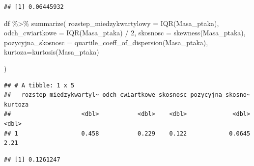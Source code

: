 \documentclass[]{article}
\newenvironment{Shaded}{\begin{snugshade}}{\end{snugshade}}
\newcommand{\AttributeTok}[1]{\textcolor[rgb]{0.77,0.63,0.00}{#1}}
\newcommand{\DecValTok}[1]{\textcolor[rgb]{0.00,0.00,0.81}{#1}}
\newcommand{\FunctionTok}[1]{\textcolor[rgb]{0.00,0.00,0.00}{#1}}
\newcommand{\NormalTok}[1]{#1}
\newcommand{\SpecialCharTok}[1]{\textcolor[rgb]{0.00,0.00,0.00}{#1}}
\begin{document}
\begin{Shaded}
\end{Shaded}

\begin{verbatim}
## [1] 0.06445932
\end{verbatim}

\begin{Shaded}
\begin{Highlighting}[]
\NormalTok{df }\SpecialCharTok{\%\textgreater{}\%}
  \FunctionTok{summarize}\NormalTok{(}
    \AttributeTok{rozstep\_miedzykwartylowy =} \FunctionTok{IQR}\NormalTok{(Masa\_ptaka), }
    \AttributeTok{odch\_cwiartkowe =} \FunctionTok{IQR}\NormalTok{(Masa\_ptaka) }\SpecialCharTok{/} \DecValTok{2}\NormalTok{,}
    \AttributeTok{skosnosc =} \FunctionTok{skewness}\NormalTok{(Masa\_ptaka),}
    \AttributeTok{pozycyjna\_skosnosc =} \FunctionTok{quartile\_coeff\_of\_dispersion}\NormalTok{(Masa\_ptaka),}
    \AttributeTok{kurtoza=}\FunctionTok{kurtosis}\NormalTok{(Masa\_ptaka)}
    
\NormalTok{  )}
\end{Highlighting}
\end{Shaded}

\begin{verbatim}
## # A tibble: 1 x 5
##   rozstep_miedzykwartyl~ odch_cwiartkowe skosnosc pozycyjna_skosno~ kurtoza
##                    <dbl>           <dbl>    <dbl>             <dbl>   <dbl>
## 1                  0.458           0.229    0.122            0.0645    2.21
\end{verbatim}

\begin{Shaded}
\end{Shaded}

\begin{verbatim}
## [1] 0.1261247
\end{verbatim}

\begin{Shaded}
\end{Shaded}
\end{document}
